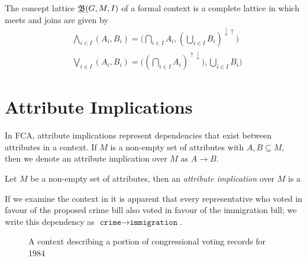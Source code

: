 \begin{theorem}
  \label{theorem:basic-theorem} The concept lattice $\underline{{\mathfrak B}} (G,M,\mathrel{I})$ of a formal context
  is a complete lattice in which meets and joins are given by
  \begin{align*}
     & \underset{i \in I}\bigwedge (A_{i}, B_{i}) = \Big( \underset{i \in I}\bigcap A_{i}, (\underset{i \in I}\bigcup B_{i})^{\downarrow \uparrow}\Big) \\
     & \underset{i \in I}\bigvee (A_{i}, B_{i}) = \Big( (\underset{i \in I}\bigcap A_{i})^{\uparrow \downarrow}), \underset{i \in I}\bigcup B_{i}\Big)
  \end{align*}
\end{theorem}

\section{Attribute Implications}
\label{section:attribute-implications}

In FCA, attribute implications represent dependencies that exist between attributes
in a context. If $M$ is a non-empty set of attributes with $A, B \subseteq M$, then
we denote an attribute implication over $M$ as $A \rightarrow B$.

\begin{definition}
  \label{definition:attribute-implication} Let $M$ be a non-empty set of attributes,
  then an \emph{attribute implication} over $M$ is a
\end{definition}

If we examine the context in  it is apparent
that every representative who voted in favour of the proposed crime bill also
voted in favour of the immigration bill; we write this dependency as $\texttt{crime
}\rightarrow \texttt{immigration}$.

\begin{figure}[H]
  \centering
  \begin{cxt}
     
      
       
     
  \end{cxt}
  \caption{A context describing a portion of congressional voting records for
  1984}
  \label{context:voting-records-small}
\end{figure}

